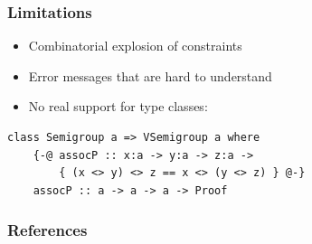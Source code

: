 \documentclass{beamer}
\begin{document}
\begin{frame}[fragile]
\frametitle{Limitations}

\begin{itemize}
\item{Combinatorial explosion of constraints}
\pause
\item{Error messages that are hard to understand}
\pause
\item{No real support for type classes:}
\end{itemize}
\begin{verbatim}
class Semigroup a => VSemigroup a where
    {-@ assocP :: x:a -> y:a -> z:a ->
        { (x <> y) <> z == x <> (y <> z) } @-}
    assocP :: a -> a -> a -> Proof
\end{verbatim}

\end{frame}

\begin{frame}[fragile]
\frametitle{References}




\end{frame}
\end{document}
